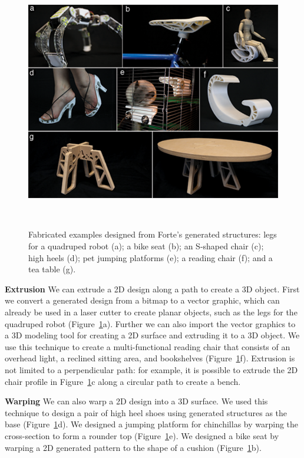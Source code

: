 \begin{figure} [t]
  \centering
  \vskip 8pt
  \includegraphics[width=1\textwidth]{figures/result_collage}
  \caption{Fabricated examples designed from Forte's generated structures: legs for a quadruped robot (a); a bike seat (b); an S-shaped chair (c); high heels (d); pet jumping platforms (e); a reading chair (f); and a tea table (g).}~\label{fig:result_collage}
\end{figure}

\textbf{Extrusion} We can extrude a 2D design along a path to create a 3D object. First we convert a generated design from a bitmap to a vector graphic, which can already be used in a laser cutter to create planar objects, such as the legs for the quadruped robot (Figure~\ref{fig:result_collage}a). Further we can also import the vector graphics to a 3D modeling tool for creating a 2D surface and extruding it to a 3D object. We use this technique to create a multi-functional reading chair that consists of an overhead light, a reclined sitting area, and bookshelves (Figure~\ref{fig:result_collage}f). Extrusion is not limited to a perpendicular path: for example, it is possible to extrude the 2D chair profile in Figure~\ref{fig:result_collage}c along a circular path to create a bench.


\textbf{Warping} We can also warp a 2D design into a 3D surface. We used this technique to design a pair of high heel shoes using generated structures as the base (Figure~\ref{fig:result_collage}d). We designed a jumping platform for chinchillas by warping the cross-section to form a rounder top (Figure~\ref{fig:result_collage}e). We designed a bike seat by warping a 2D generated pattern to the shape of a cushion (Figure~\ref{fig:result_collage}b).

